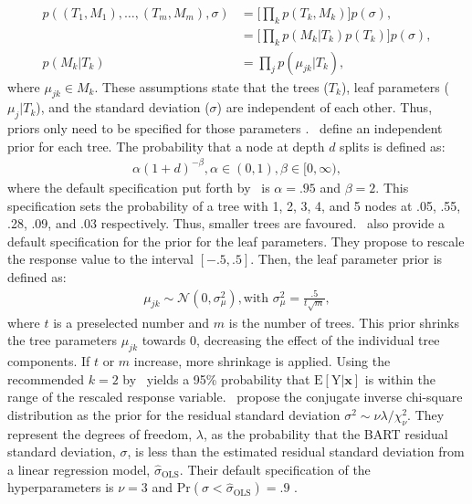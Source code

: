\documentclass[10pt, a4paper, titlepage]{article}
\begin{document}
\begin{subequations}
\begin{align}
\label{eq:independence_prior}
    p((T_1, M_1), \dots, (T_m, M_m), \sigma) &= \Big[\prod_{k}p(T_k, M_k)\Big]p(\sigma), \\
    &= \Big[\prod_{k}p(M_k|T_k)p(T_k)\Big]p(\sigma), \\
    p(M_k|T_k) &= \prod_{j}p(\mu_{jk}|T_k),
\end{align}
\end{subequations} where $\mu_{jk} \in M_k$. These assumptions state that the trees ($T_{k}$), leaf parameters ($\mu_{j}|T_{k}$), and the standard deviation ($\sigma$) are independent of each other. Thus, priors only need to be specified for those parameters \citep{chipman2010, hill2020, chipman2006, chipman1998}.~\citet{chipman1998} define an independent prior for each tree. The probability that a node at depth $d$ splits is defined as: 
\begin{align}
\label{eq:tree_prior}
    \alpha(1+d)^{-\beta}, \alpha \in (0,1), \beta \in [0, \infty),
\end{align} where the default specification put forth by~\citet{chipman2006,chipman2010} is $\alpha = .95$ and $\beta = 2$. This specification sets the probability of a tree with 1, 2, 3, 4, and 5 nodes at .05, .55, .28, .09, and .03 respectively. Thus, smaller trees are favoured.~\citet{chipman2006,chipman2010} also provide a default specification for the prior for the leaf parameters. They propose to rescale the response value to the interval $[-.5,.5]$. Then, the leaf parameter prior is defined as: 
\begin{align}
\label{eq:leaf_prior}
    \mu_{jk} \sim \mathcal{N}(0, \sigma^2_{\mu}), \text{with } \sigma^2_{\mu} = \frac{.5}{t\sqrt{m}},
\end{align} where $t$ is a preselected number and $m$ is the number of trees. This prior shrinks the tree parameters $\mu_{jk}$ towards 0, decreasing the effect of the individual tree components. If $t$ or $m$ increase, more shrinkage is applied. Using the recommended $k = 2$ by~\citet{chipman2006,chipman2010} yields a 95\% probability that $\text{E}[\text{Y}|\textbf{x}]$ is within the range of the rescaled response variable.~\citet{chipman2006,chipman2010} propose the conjugate inverse chi-square distribution as the prior for the residual standard deviation $\sigma^2 \sim \nu\lambda/\chi^{2}_{\nu}$. They represent the degrees of freedom, $\lambda$, as the probability that the BART residual standard deviation, $\sigma$, is less than the estimated residual standard deviation from a linear regression model, $\hat{\sigma}_\text{OLS}$. Their default specification of the hyperparameters is $\nu = 3$ and $\text{Pr}(\sigma < \hat{\sigma}_\text{OLS}) = .9$ \citep{chipman2010, hill2020, chipman2006, chipman1998}.
\end{document}
